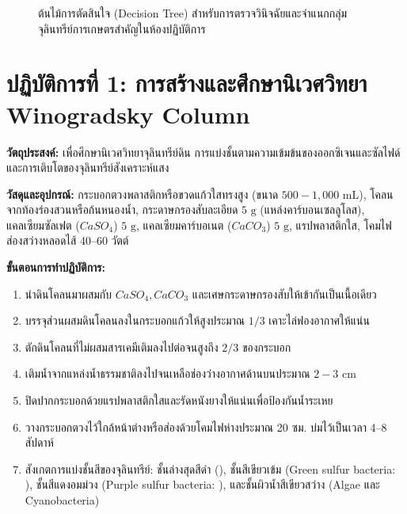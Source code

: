 \begin{figure}[ht]
{
}
\caption{ต้นไม้การตัดสินใจ (Decision Tree) สำหรับการตรวจวินิจฉัยและจำแนกกลุ่มจุลินทรีย์การเกษตรสำคัญในห้องปฏิบัติการ}
\label{fig:microbe_diagnostic_tree}
\end{figure}

\section{ปฏิบัติการที่ 1: การสร้างและศึกษานิเวศวิทยา Winogradsky Column}

\textbf{วัตถุประสงค์:} เพื่อศึกษานิเวศวิทยาจุลินทรีย์ดิน การแบ่งชั้นตามความเข้มข้นของออกซิเจนและซัลไฟด์ และการเติบโตของจุลินทรีย์สังเคราะห์แสง

\begin{labprotocol}
\textbf{วัสดุและอุปกรณ์:} กระบอกตวงพลาสติกหรือขวดแก้วใสทรงสูง (ขนาด $500 - 1,000\text{ mL}$), โคลนจากท้องร่องสวนหรือก้นหนองน้ำ, กระดาษกรองสับละเอียด $5\text{ g}$ (แหล่งคาร์บอนเซลลูโลส), แคลเซียมซัลเฟต ($CaSO_4$) $5\text{ g}$, แคลเซียมคาร์บอเนต ($CaCO_3$) $5\text{ g}$, แรปพลาสติกใส, โคมไฟส่องสว่างหลอดไส้ 40--60 วัตต์

\textbf{ขั้นตอนการทำปฏิบัติการ:}
\begin{enumerate}
    \item นำดินโคลนมาผสมกับ $CaSO_4, CaCO_3$ และเศษกระดาษกรองสับให้เข้ากันเป็นเนื้อเดียว
    \item บรรจุส่วนผสมดินโคลนลงในกระบอกแก้วให้สูงประมาณ $1/3$ เคาะไล่ฟองอากาศให้แน่น
    \item ตักดินโคลนที่ไม่ผสมสารเคมีเติมลงไปต่อจนสูงถึง $2/3$ ของกระบอก
    \item เติมน้ำจากแหล่งน้ำธรรมชาติลงไปจนเหลือช่องว่างอากาศด้านบนประมาณ $2 - 3\text{ cm}$
    \item ปิดปากกระบอกด้วยแรปพลาสติกใสและรัดหนังยางให้แน่นเพื่อป้องกันน้ำระเหย
    \item วางกระบอกตวงไว้ใกล้หน้าต่างหรือส่องด้วยโคมไฟห่างประมาณ 20 ซม. บ่มไว้เป็นเวลา 4--8 สัปดาห์
    \item สังเกตการแบ่งชั้นสีของจุลินทรีย์: ชั้นล่างสุดสีดำ (), ชั้นสีเขียวเข้ม (Green sulfur bacteria: ), ชั้นสีแดงอมม่วง (Purple sulfur bacteria: ), และชั้นผิวน้ำสีเขียวสว่าง (Algae และ Cyanobacteria)
\end{enumerate}
\end{labprotocol}

